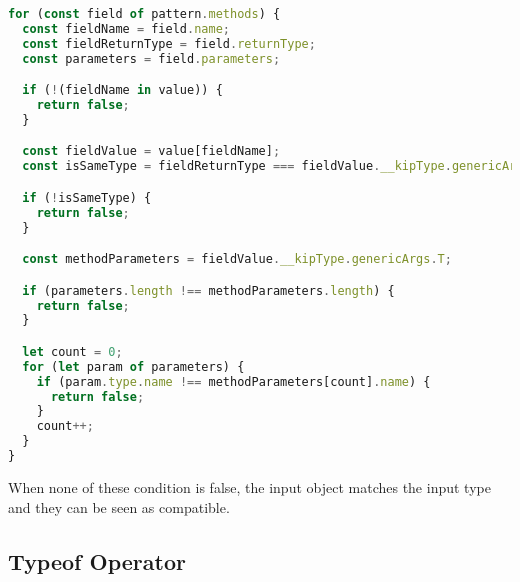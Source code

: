 \begin{lstlisting}[language=Typescript,caption=Matches operator method comparison,label=lst:implementation:matchesmethod]
for (const field of pattern.methods) {
  const fieldName = field.name;
  const fieldReturnType = field.returnType;
  const parameters = field.parameters;

  if (!(fieldName in value)) {
    return false;
  }

  const fieldValue = value[fieldName];
  const isSameType = fieldReturnType === fieldValue.__kipType.genericArgs.R;

  if (!isSameType) {
    return false;
  }

  const methodParameters = fieldValue.__kipType.genericArgs.T;

  if (parameters.length !== methodParameters.length) {
    return false;
  }

  let count = 0;
  for (let param of parameters) {
    if (param.type.name !== methodParameters[count].name) {
      return false;
    }
    count++;
  }
}
\end{lstlisting}

When none of these condition is false, the input object matches the input type and they can be seen as compatible.

\subsection{Typeof Operator}
\label{subsec:typeof}



